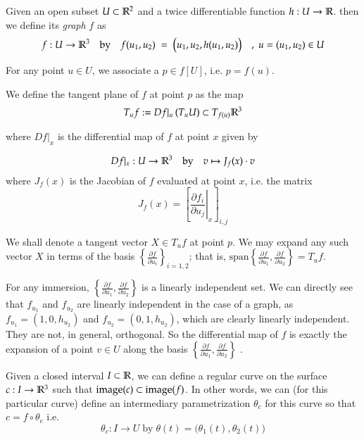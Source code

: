         
        
        Given an open subset $U\subset \mathbb{R}^2$ and a twice differentiable function  $h: U \to \mathbb{R}$.
        then we define its \textit{graph} $f$ as
        \[
	        f: U \to \mathbb{R}^3 \quad \textrm{by} \quad f(u_1, u_2) \;=\; \big(u_1 , u_2 , h(u_1,u_2)\big)
	        \quad,\; u = (u_1, u_2) \in U
        \]
        
        For any point $u \in U$, we associate a $p \in f[U]$, i.e. $p = f(u)$.
        
        We define the tangent plane of $f$ at point $p$ as the map
        \[
        T_u f := Df\vert_u \left(T_u U\right) \subset T_{f(u)} \mathbb{R}^3
        \]
        
        where $Df\vert_x$ is the differential map of $f$ at point $x$ given by
        
        \[
	        Df|_x : U \to \mathbb{R}^3 \quad \textrm{by} \quad v \mapsto J_f (x) \cdot v
        \]
	  where $J_f(x)$ is the Jacobian of $f$ evaluated at point $x$, i.e. the matrix
	  \[
	  J_f (x) = \left[ \left.\frac{\partial f_i}{\partial u_j}\right\vert_x \right]_{i,j}
	  \]
	  
	  We shall denote a tangent vector $X \in T_u f$ at point $p$. We may expand any such vector $X$ in terms of the basis $\left\{ \frac{\partial f}{\partial u_i}\right\}_{i=1,2}$; that is,
	  $\textrm{span}\left\{ \frac{\partial f}{\partial u_1}, \frac{\partial f}{\partial u_2}\right\} = T_u f$. 
	  
	  	For any immersion, $\left\{\frac{\partial f}{\partial u_1} , \frac{\partial f}{\partial u_2}\right\}$ is a linearly independent set. We can directly see that $f_{u_1}$ and $f_{u_2}$ are linearly independent in the case of a graph, as $f_{u_1} = (1,0,h_{u_2})$ and $f_{u_2} = (0,1,h_{u_2})$, which are clearly linearly independent. They are not, in general, orthogonal.
	  	So the differential map of $f$ is exactly the expansion of
	  	a point  $v \in U$ along the basis
	  	$\left\{\frac{\partial f}{\partial u_1} , \frac{\partial f}{\partial u_2}\right\}$ .
	  	
	  	
	  	
	  Given a closed interval $I \subset \mathbb{R}$, we can define a regular curve on the surface
	  $c: I \to \mathbb{R}^3$ such that $\mathrm{image}(c) \subset \mathrm{image}(f)$. In other words, we can (for this particular curve) define an intermediary parametrization $\theta_c$ for this curve so that
      $ c = f \circ \theta_c $ i.e.
	  \[
	  \theta_c : I \to U \; \textrm{by} \; \theta(t) = \big(\theta_1(t), \theta_2(t)\big)
	  \]
	  
